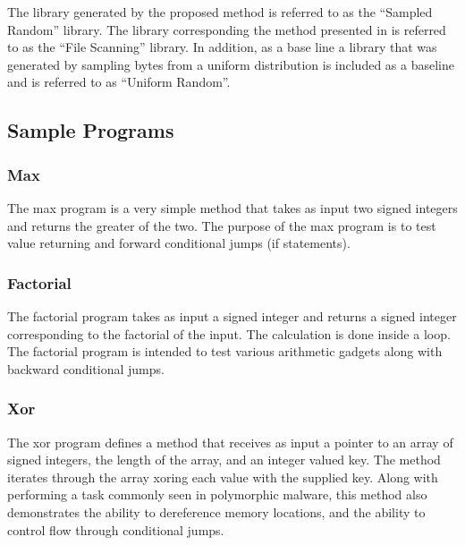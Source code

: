 \documentclass[finalcopy,short]{srpaper}
\begin{document}
            The library generated by the proposed method is referred to as the
            ``Sampled Random'' library. The library corresponding the method
            presented in \cite{franken} is referred to as the ``File Scanning''
            library. In addition, as a base line a library that was generated by
            sampling bytes from a uniform distribution is included as a baseline
            and is referred to as ``Uniform Random''.
        
        \subsection{Sample Programs}

            \subsubsection{Max}

                The max program is a very simple method that takes as input two
                signed integers and returns the greater of the two. The purpose
                of the max program is to test value returning and forward
                conditional jumps (if statements).

            \subsubsection{Factorial}

                The factorial program takes as input a signed integer and
                returns a signed integer corresponding to the factorial of the
                input. The calculation is done inside a loop. The factorial
                program is intended to test various arithmetic gadgets along
                with backward conditional jumps.

            \subsubsection{Xor}

                The xor program defines a method that receives as input a
                pointer to an array of signed integers, the length of the array,
                and an integer valued key. The method iterates through the array
                xoring each value with the supplied key. Along with performing a
                task commonly seen in polymorphic malware, this method also
                demonstrates the ability to dereference memory locations, and
                the ability to control flow through conditional jumps.
            
\end{document}
